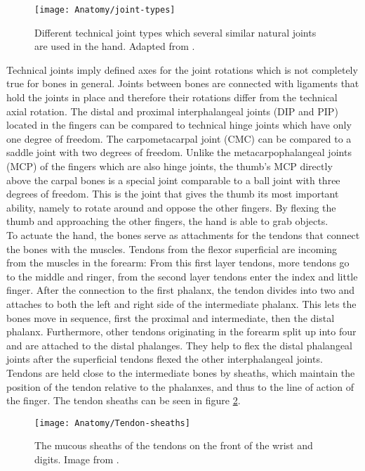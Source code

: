 \documentclass[main]{subfiles}
\begin{document}
\begin{figure}[htp]
\centering
\texttt{[image: Anatomy/joint-types]}
\caption[Technical joints]{Different technical joint types  which several similar natural joints are used in the hand. Adapted from \cite{Schuenke2005}.}
\label{joint-types}
\end{figure}
Technical joints imply defined axes for the joint rotations which is not completely true for bones in general. Joints between bones are connected with ligaments that hold the joints in place and therefore their rotations differ from the technical axial rotation. The distal and proximal interphalangeal joints (DIP and PIP) located in the fingers can be compared to technical hinge joints which have only one degree of freedom. The carpometacarpal joint (CMC) can be compared to a saddle joint with two degrees of freedom. Unlike the metacarpophalangeal joints (MCP) of the fingers which are also hinge joints, the thumb's MCP directly above the carpal bones is a special joint comparable to a ball joint with three degrees of freedom. This is the joint that gives the thumb its most important ability, namely to rotate around and oppose the other fingers. By flexing the thumb and approaching the other fingers, the hand is able to grab objects.\\
To actuate the hand, the bones serve as attachments for the tendons that connect the bones with the muscles. Tendons from the flexor superficial are incoming from the muscles in the forearm: From this first layer tendons, more tendons go to the middle and ringer, from the second layer tendons enter the index and little finger. After the connection to the first phalanx, the tendon divides into two and attaches to both the left and right side of the intermediate phalanx. This lets the bones move in sequence, first the proximal and intermediate, then the distal phalanx. Furthermore, other tendons originating in the forearm split up into four and are attached to the distal phalanges. They help to flex the distal phalangeal joints after the superficial tendons flexed the other interphalangeal joints. Tendons are held close to the intermediate bones by sheaths, which maintain the position of the tendon relative to the phalanxes, and thus to the line of action of the finger. The tendon sheaths can be seen in figure \ref{Tendon-sheaths}.

\begin{figure}[H]
\centering
\texttt{[image: Anatomy/Tendon-sheaths]}
\caption[Tendon sheaths of the hand]{The mucous sheaths of the tendons on the front of the wrist and digits. Image from \cite{Gray1918}.}
\label{Tendon-sheaths}
\end{figure}
\end{document}
